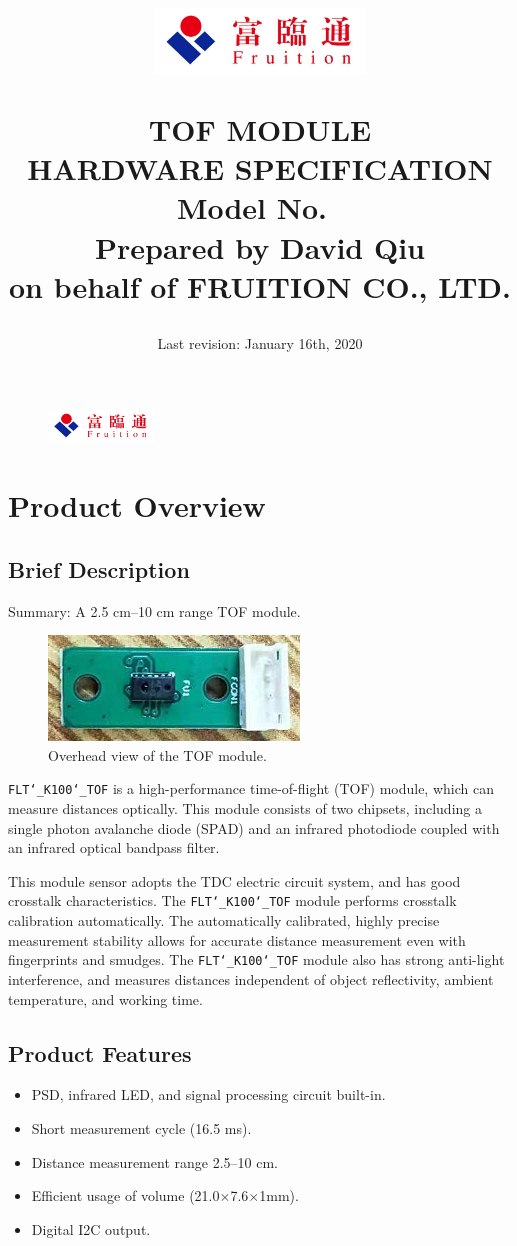 \documentclass{scrreprt}
\title{
	\begin{figure}[H]
		\centering\includegraphics[width=0.5\textwidth]{logo.jpeg}
	\end{figure}
	\vspace{1cm}
	\flushright
	\Huge{TOF MODULE}\\
	\Huge{HARDWARE SPECIFICATION}\\
	\vspace{2cm}
	\huge{Model No.\ \modelno}\\
	\vspace{2cm}
	\LARGE{Prepared by David Qiu \\ on behalf of FRUITION CO., LTD.}
}
\date{
	Last revision: January 16th, 2020\\
}
\newcommand{\pchapter}[1]{
	\begingroup\let\clearpage\relax
	\newpage
	\begin{figure}[H]
		\includegraphics[width=0.25\textwidth]{logo.jpeg}
	\end{figure}
	\chapter{#1}
	\endgroup
}
\newcommand{\modelno}{%
	\texttt{FLT\char`_K100\char`_TOF}
}
\newcommand{\x}{$\times$}
\begin{document}
\begin{CJK*}{UTF8}{gbsn}
\maketitle
\tableofcontents

\pchapter{Product Overview}
\section{Brief Description}
Summary: A 2.5 cm--10 cm range TOF module.

\begin{figure}[H]
\center\includegraphics{tof-picture.png}
\caption{Overhead view of the TOF module.}
\end{figure}

\modelno is a high-performance time-of-flight (TOF) module, which can measure
distances optically. This module consists of two chipsets, including a single
photon avalanche diode (SPAD) and an infrared photodiode coupled with an
infrared optical bandpass filter.

This module sensor adopts the TDC electric circuit system, and has good
crosstalk characteristics. The \modelno module performs crosstalk calibration
automatically. The automatically calibrated, highly precise measurement
stability allows for accurate distance measurement even with fingerprints and
smudges. The \modelno module also has strong anti-light interference, and
measures distances independent of object reflectivity, ambient temperature, and
working time.
\section{Product Features}
\begin{itemize}
	\item PSD, infrared LED, and signal processing circuit built-in.
	\item Short measurement cycle (16.5 ms).
	\item Distance measurement range 2.5--10 cm.
	\item Efficient usage of volume (21.0\x7.6\x1mm).
	\item Digital I2C output.
\end{itemize}


\end{CJK*}
\end{document}
